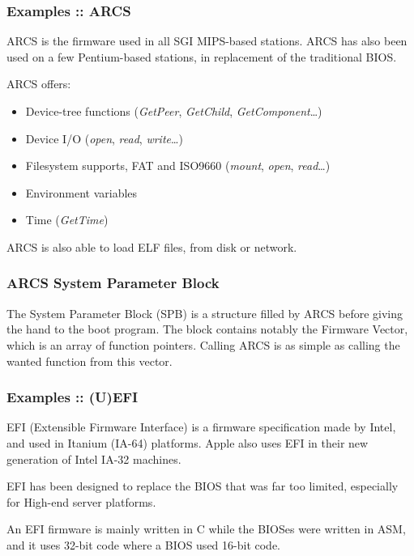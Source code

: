 \begin{frame}
  \frametitle{Examples :: ARCS}

  ARCS is the firmware used in all SGI MIPS-based stations. ARCS has
  also been used on a few Pentium-based stations, in replacement of
  the traditional BIOS.

  \-

  ARCS offers:

  \begin{itemize}
  \item
    Device-tree functions (\emph{GetPeer}, \emph{GetChild},
    \emph{GetComponent}\ldots)
  \item
    Device I/O (\emph{open}, \emph{read}, \emph{write}\ldots)
  \item
    Filesystem supports, FAT and ISO9660 (\emph{mount}, \emph{open},
    \emph{read}\ldots)
  \item
    Environment variables
  \item
    Time (\emph{GetTime})
  \end{itemize}

  \-

  ARCS is also able to load ELF files, from disk or network.

\end{frame}

\begin{frame}
  \frametitle{ARCS System Parameter Block}

  The System Parameter Block (SPB) is a structure filled by ARCS before giving the 
  hand to the boot program. The block contains notably the Firmware Vector, which is 
  an array of function pointers. Calling ARCS is as simple as calling the wanted function 
  from this vector. 

\end{frame}


\begin{frame}
  \frametitle{Examples :: (U)EFI}

  EFI (Extensible Firmware Interface) is a firmware specification made by Intel, and used in Itanium (IA-64) platforms. Apple also uses EFI in their new generation of Intel IA-32 machines.

  \-

  EFI has been designed to replace the BIOS that was far too limited, especially for High-end server platforms.

  \-

  An EFI firmware is mainly written in C while the BIOSes were written in ASM, and it uses 32-bit code where a BIOS used 16-bit code.

\end{frame}

